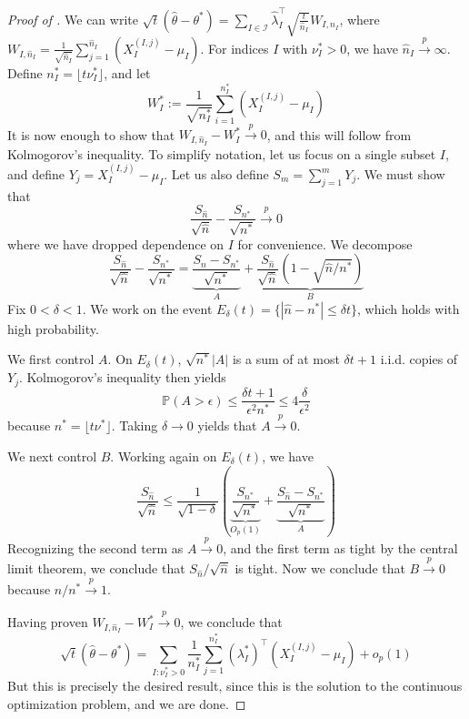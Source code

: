\documentclass{article} %
\newcommand{\p}{\mathbb{P}}
\begin{document}
\begin{proof}[Proof of ]
We can write $\sqrt{t}(\hat{\theta} - \theta^*) = \sum_{I \in \mathcal{I}} \hat{\lambda}_I^\top \sqrt{\frac{t}{\hat{n}_I}} W_{I, \hat{n}_I}$, where $W_{I, \hat{n}_I} = \frac{1}{\sqrt{\hat{n}_I}} \sum_{j=1}^{\hat{n}_I} (X_I^{(I,j)} - \mu_I)$. For indices $I$ with $\nu_I^* > 0$, we have $\hat{n}_I \xrightarrow{p} \infty$. Define $n_I^* = \lfloor t\nu_I^*\rfloor $, and let 
\[
W^*_I:=\frac{1}{\sqrt{n_I^*}}\sum_{i=1}^{n_I^*} (X_I^{(I,j)}-\mu_I)
\]
It is now enough to show that $W_{I,\hat{n}_I}-W^*_I\overset{p}{\to}0$, and this will follow from Kolmogorov's inequality. To simplify notation, let us focus on a single subset $I$, and define $Y_j = X_I^{(I,j)}-\mu_I$. Let us also define $S_m=\sum_{j=1}^m Y_j$. We must show that
\[
\frac{S_{\hat{n}}}{\sqrt{\hat{n}}}-\frac{S_{n^*}}{\sqrt{n^*}}\overset{p}{\to}0
\]
where we have dropped dependence on $I$ for convenience. We decompose
\[
\frac{S_{\hat{n}}}{\sqrt{\hat{n}}}-\frac{S_{n^*}}{\sqrt{n^*}} = \underbrace{\frac{S_{\hat{n}}-S_{n^*}}{\sqrt{n^*}}}_A + \underbrace{\frac{S_{\hat{n}}}{\sqrt{\hat{n}}}\left(1-\sqrt{\hat{n}/n^*}\right)}_B
\]
Fix $0<\delta<1$. We work on the event $E_\delta(t)=\{|\hat{n}-n^*|\leq \delta t\}$, which holds with high probability.

We first control $A$. On $E_\delta(t)$, $\sqrt{n^*}|A|$ is a sum of at most $\delta t+1$ i.i.d. copies of $Y_j$. Kolmogorov's inequality then yields
\[
\p\left(A>\epsilon \right) \leq \frac{\delta t+1}{\epsilon^2 n^*}\leq 4\frac{\delta}{\epsilon^2}
\]
because $n^*=\lfloor t\nu^*\rfloor$. Taking $\delta\to0$ yields that $A\overset{p}{\to}0$.

We next control $B$. Working again on $E_\delta(t)$, we have
\[
\frac{S_{\hat{n}}}{\sqrt{\hat{n}}} \leq \frac{1}{\sqrt{1-\delta}}\left(\underbrace{\frac{S_{n^*}}{\sqrt{n^*}}}_{O_p(1)}  + \underbrace{\frac{S_{\hat{n}}-S_{n^*}}{\sqrt{n^*}}}_A\right) 
\]
Recognizing the second term as $A\overset{p}{\to}0$, and the first term as tight by the central limit theorem, we conclude that $S_{\hat{n}}/\sqrt{\hat{n}}$ is tight. Now we conclude that $B\overset{p}{\to}0$ because $\hat{n}/n^*\overset{p}{\to}1$.

Having proven $W_{I,\hat{n}_I}-W^*_I\overset{p}{\to}0$, we conclude that
\[
\sqrt{t}(\hat{\theta}-\theta^*) = \sum_{I:\nu_I^*>0} \frac{1}{n^*_I} \sum_{j=1}^{n^*_I} (\lambda^*_I)^\top (X_I^{(I,j)}-\mu_I) + o_p(1)
\]
But this is precisely the desired result, since this is the solution to the continuous optimization problem, and we are done.
\end{proof}
\end{document}
